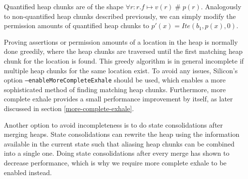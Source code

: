 \documentclass[11pt]{article}
\DeclareMathOperator{\perm}{\mathbin{\#}}
\begin{document}
    Quantified heap chunks are of the shape
    $\forall r: r.f \mapsto v(r) \perm p(r)$.
    Analogously to non-quantified heap chunks described previously,
    we can simply modify the permission amounts of
    quantified heap chunks to $p'(x) = Ite(b_1, p(x), 0)$.
    

    Proving assertions or permission amounts of a location in the heap
    is normally done greedily, where the heap chunks are
    traversed until the first matching heap chunk for the location is found.
    This greedy algorithm is in general incomplete if multiple heap chunks for the same location
    exist. To avoid any issues,
    Silicon's option \texttt{--enableMoreCompleteExhale} should be used,
    which enables a more sophisticated method of finding matching heap chunks.
    Furthermore, more complete exhale provides a small performance improvement
    by itself, as later discussed in section \ref{more-complete-exhale}.

    Another option to avoid incompleteness is to do state consolidations
    after merging heaps. State consolidations can rewrite the heap using the information
    available in the current state such that aliasing heap chunks can be combined into a single one.
    Doing state consolidations after every merge has shown to decrease performance, which is why
    we require more complete exhale to be enabled instead.


\end{document}
